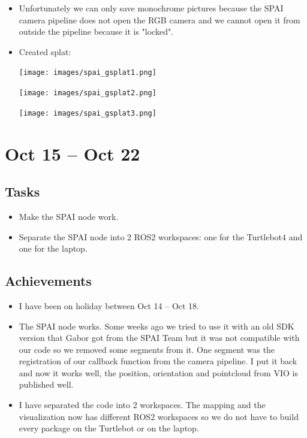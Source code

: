 \documentclass{article}
\begin{document}
\begin{itemize}
    \item Unfortunately we can only save monochrome pictures because the SPAI camera pipeline does not open the RGB camera and we cannot open it from outside the pipeline because it is "locked".
    \item Created splat:\par
    \begin{minipage}{\linewidth}
        \centering
        \texttt{[image: images/spai\_gsplat1.png]}
    \end{minipage}
    \begin{minipage}{\linewidth}
        \centering
        \texttt{[image: images/spai\_gsplat2.png]}
    \end{minipage}
    \begin{minipage}{\linewidth}
        \centering
        \texttt{[image: images/spai\_gsplat3.png]}
    \end{minipage}
    
\end{itemize}

\newpage

\section{Oct 15 -- Oct 22}
\subsection{Tasks}
\begin{itemize}
    \item Make the SPAI node work. 
    \item Separate the SPAI node into 2 ROS2 workspaces: one for the Turtlebot4 and one for the laptop.
\end{itemize}

\subsection{Achievements}
\begin{itemize}
    \item I have been on holiday between Oct 14 -- Oct 18.
    \item The SPAI node works. Some weeks ago we tried to use it with an old SDK version that Gabor got from the SPAI Team but it was not compatible with our code so we removed some segments from it. One segment was the registration of our callback function from the camera pipeline. I put it back and now it works well, the position, orientation and pointcloud from VIO is published well.
    \item I have separated the code into 2 workspaces. The mapping and the visualization now has different ROS2 workspaces so we do not have to build every package on the Turtlebot or on the laptop.
\end{itemize}
\end{document}
